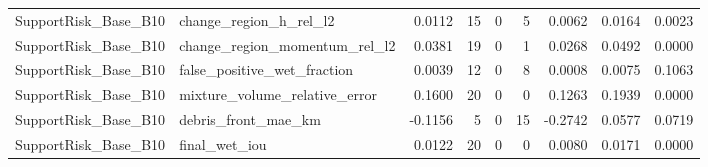 \begin{tabular}{llrrrrrrr}
SupportRisk\_Base\_B10 & change\_region\_h\_rel\_l2 & 0.0112 & 15 & 0 & 5 & 0.0062 & 0.0164 & 0.0023 \\
SupportRisk\_Base\_B10 & change\_region\_momentum\_rel\_l2 & 0.0381 & 19 & 0 & 1 & 0.0268 & 0.0492 & 0.0000 \\
SupportRisk\_Base\_B10 & false\_positive\_wet\_fraction & 0.0039 & 12 & 0 & 8 & 0.0008 & 0.0075 & 0.1063 \\
SupportRisk\_Base\_B10 & mixture\_volume\_relative\_error & 0.1600 & 20 & 0 & 0 & 0.1263 & 0.1939 & 0.0000 \\
SupportRisk\_Base\_B10 & debris\_front\_mae\_km & -0.1156 & 5 & 0 & 15 & -0.2742 & 0.0577 & 0.0719 \\
SupportRisk\_Base\_B10 & final\_wet\_iou & 0.0122 & 20 & 0 & 0 & 0.0080 & 0.0171 & 0.0000 \\
\bottomrule
\end{tabular}
